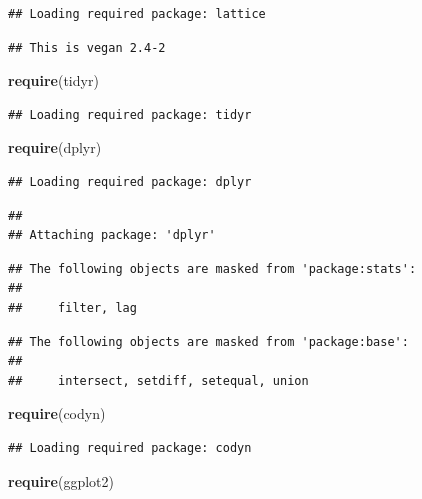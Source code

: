 \documentclass[]{article}
\newenvironment{Shaded}{\begin{snugshade}}{\end{snugshade}}
\newcommand{\KeywordTok}[1]{\textcolor[rgb]{0.13,0.29,0.53}{\textbf{{#1}}}}
\newcommand{\NormalTok}[1]{{#1}}
\begin{document}
\begin{verbatim}
## Loading required package: lattice
\end{verbatim}

\begin{verbatim}
## This is vegan 2.4-2
\end{verbatim}

\begin{Shaded}
\begin{Highlighting}[]
\KeywordTok{require}\NormalTok{(tidyr)}
\end{Highlighting}
\end{Shaded}

\begin{verbatim}
## Loading required package: tidyr
\end{verbatim}

\begin{Shaded}
\begin{Highlighting}[]
\KeywordTok{require}\NormalTok{(dplyr)}
\end{Highlighting}
\end{Shaded}

\begin{verbatim}
## Loading required package: dplyr
\end{verbatim}

\begin{verbatim}
## 
## Attaching package: 'dplyr'
\end{verbatim}

\begin{verbatim}
## The following objects are masked from 'package:stats':
## 
##     filter, lag
\end{verbatim}

\begin{verbatim}
## The following objects are masked from 'package:base':
## 
##     intersect, setdiff, setequal, union
\end{verbatim}

\begin{Shaded}
\begin{Highlighting}[]
\KeywordTok{require}\NormalTok{(codyn)}
\end{Highlighting}
\end{Shaded}

\begin{verbatim}
## Loading required package: codyn
\end{verbatim}

\begin{Shaded}
\begin{Highlighting}[]
\KeywordTok{require}\NormalTok{(ggplot2)}
\end{Highlighting}
\end{Shaded}
\end{document}
